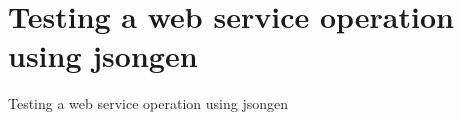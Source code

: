 \section{Testing a web service operation using jsongen}

\begin{frame}{Testing a web service operation using jsongen}

\end{frame}
